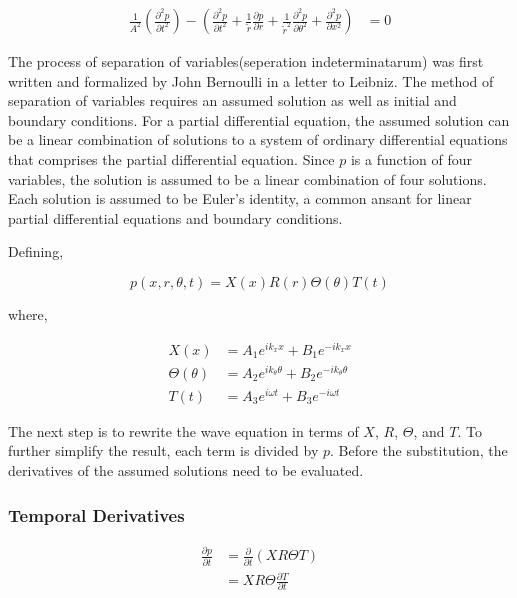 \begin{align*} 
    \frac{1}{A^2}\left(
        \frac{\partial^2 {p}}{\partial t^2}
    \right) - 
        \left(
            \frac{\partial^2 {p}}{\partial t^2} + 
            \frac{1}{\tilde{r}}\frac{\partial p}{\partial r} +
            \frac{1}{\tilde{r}^2} \frac{\partial^2 p}{\partial \theta^2} + 
            \frac{\partial^2 p}{\partial x^2} 
        \right) &= 0  
\end{align*} 

The process of separation of variables(seperation indeterminatarum)
was first written and formalized by John Bernoulli in a letter to Leibniz. The method
of separation of variables requires an assumed solution as well as initial and boundary 
conditions. For a partial differential equation, the assumed solution can be a 
linear combination of solutions to a system of ordinary differential equations that
comprises the partial differential equation. Since $p$ is a function of four
variables, the solution is assumed to be a linear combination of four solutions.
Each solution is assumed to be Euler's identity, a common ansant for linear partial 
differential equations and boundary conditions.

Defining,

\begin{equation}
    p(x,r,\theta,t) = X(x) R(r) \Theta(\theta) T(t)
\end{equation}

where, 

\begin{align*}
    X(x) &=
    A_1 e^{ik_x x} +
    B_1 e^{-ik_x x }\\
    \Theta(\theta) &=
    A_2 e^{i k_{\theta} \theta } +
    B_2 e^{-ik_{\theta} \theta }\\
    T(t) &=
    A_3 e^{i \omega t } +
    B_3 e^{-i\omega t  }
\end{align*}

The next step is to rewrite the wave equation in terms of $X$, $R$, $\Theta$,
and $T$. To further simplify the result, each term is divided by $p$.
Before the substitution, the derivatives of the assumed solutions need to be
evaluated.


\subsubsection{Temporal Derivatives}

\begin{align*}
    \frac{\partial p}{\partial t} 
    &=
    \frac{\partial }{\partial t}  \left( XR\Theta T \right) \\
    &=
    XR\Theta\frac{\partial T}{\partial t}  
\end{align*}


